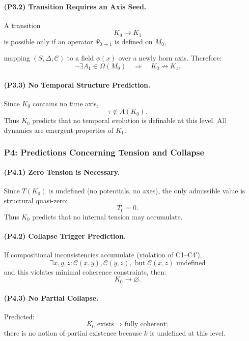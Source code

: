 \paragraph{(P3.2) Transition Requires an Axis Seed.}
A transition  
\[
K_0 \longrightarrow K_1
\]
is possible only if an operator $\Psi_{0\to1}$ is defined on $M_0$,
  
mapping $(S,\Delta,\mathcal{C})$ to a field $\phi(x)$ over a newly born axis.  
Therefore:
\[
\neg\exists A_1 \in \Omega(M_0)
\quad\Rightarrow\quad
K_0 \not\to K_1.
\]

\paragraph{(P3.3) No Temporal Structure Prediction.}
Since $K_0$ contains no time axis,
\[
\tau \notin A(K_0).
\]
Thus $K_0$ predicts that no temporal evolution is definable at this level.  
All dynamics are emergent properties of $K_1$.

\subsubsection{P4: Predictions Concerning Tension and Collapse}

\paragraph{(P4.1) Zero Tension is Necessary.}
Since $T(K_0)$ is undefined (no potentials, no axes),  
the only admissible value is structural quasi-zero:
\[
T_0 = 0.
\]
Thus $K_0$ predicts that no internal tension may accumulate.

\paragraph{(P4.2) Collapse Trigger Prediction.}
If compositional inconsistencies accumulate (violation of C1–C4′),
\[
\exists x,y,z: \mathcal{C}(x,y), \mathcal{C}(y,z), \text{ but } \mathcal{C}(x,z) \text{ undefined}
\]
and this violates minimal coherence constraints, then:
\[
K_0 \to \varnothing.
\]

\paragraph{(P4.3) No Partial Collapse.}
Predicted:
\[
K_0 \text{ exists} \Rightarrow \text{fully coherent};
\]
there is no notion of partial existence because $k$ is undefined at this level.

